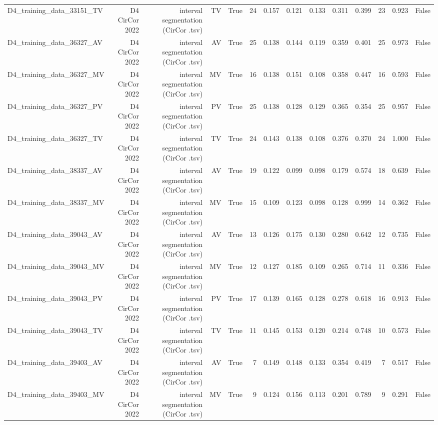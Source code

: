\begin{table}[htbp]
\begin{tabular}{lrrrrrrrrrrrrr}
    D4\_training\_data\_33151\_TV & D4 CirCor 2022 & interval segmentation (CirCor .tsv) & TV & True & 24 & 0.157 & 0.121 & 0.133 & 0.311 & 0.399 & 23 & 0.923 & False \\
    D4\_training\_data\_36327\_AV & D4 CirCor 2022 & interval segmentation (CirCor .tsv) & AV & True & 25 & 0.138 & 0.144 & 0.119 & 0.359 & 0.401 & 25 & 0.973 & False \\
    D4\_training\_data\_36327\_MV & D4 CirCor 2022 & interval segmentation (CirCor .tsv) & MV & True & 16 & 0.138 & 0.151 & 0.108 & 0.358 & 0.447 & 16 & 0.593 & False \\
    D4\_training\_data\_36327\_PV & D4 CirCor 2022 & interval segmentation (CirCor .tsv) & PV & True & 25 & 0.138 & 0.128 & 0.129 & 0.365 & 0.354 & 25 & 0.957 & False \\
    D4\_training\_data\_36327\_TV & D4 CirCor 2022 & interval segmentation (CirCor .tsv) & TV & True & 24 & 0.143 & 0.138 & 0.108 & 0.376 & 0.370 & 24 & 1.000 & False \\
    D4\_training\_data\_38337\_AV & D4 CirCor 2022 & interval segmentation (CirCor .tsv) & AV & True & 19 & 0.122 & 0.099 & 0.098 & 0.179 & 0.574 & 18 & 0.639 & False \\
    D4\_training\_data\_38337\_MV & D4 CirCor 2022 & interval segmentation (CirCor .tsv) & MV & True & 15 & 0.109 & 0.123 & 0.098 & 0.128 & 0.999 & 14 & 0.362 & False \\
    D4\_training\_data\_39043\_AV & D4 CirCor 2022 & interval segmentation (CirCor .tsv) & AV & True & 13 & 0.126 & 0.175 & 0.130 & 0.280 & 0.642 & 12 & 0.735 & False \\
    D4\_training\_data\_39043\_MV & D4 CirCor 2022 & interval segmentation (CirCor .tsv) & MV & True & 12 & 0.127 & 0.185 & 0.109 & 0.265 & 0.714 & 11 & 0.336 & False \\
    D4\_training\_data\_39043\_PV & D4 CirCor 2022 & interval segmentation (CirCor .tsv) & PV & True & 17 & 0.139 & 0.165 & 0.128 & 0.278 & 0.618 & 16 & 0.913 & False \\
    D4\_training\_data\_39043\_TV & D4 CirCor 2022 & interval segmentation (CirCor .tsv) & TV & True & 11 & 0.145 & 0.153 & 0.120 & 0.214 & 0.748 & 10 & 0.573 & False \\
    D4\_training\_data\_39403\_AV & D4 CirCor 2022 & interval segmentation (CirCor .tsv) & AV & True & 7 & 0.149 & 0.148 & 0.133 & 0.354 & 0.419 & 7 & 0.517 & False \\
    D4\_training\_data\_39403\_MV & D4 CirCor 2022 & interval segmentation (CirCor .tsv) & MV & True & 9 & 0.124 & 0.156 & 0.113 & 0.201 & 0.789 & 9 & 0.291 & False \\

\end{tabular}
\end{table}
